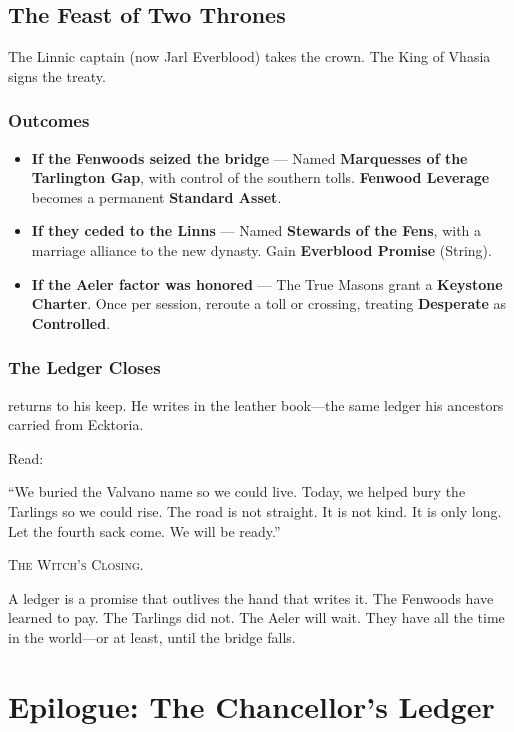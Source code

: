 \documentclass[11pt,a5paper]{book}
\newenvironment{witchclosing}
  {\begin{quoting}[font={small\itshape}, leftmargin=2em, rightmargin=2em]\noindent\textsc{The Witch's Closing.}\par}
  {\end{quoting}}
\begin{document}
\section*{The Feast of Two Thrones}

The Linnic captain (now Jarl Everblood) takes the crown. The King of Vhasia signs the treaty.

\subsection*{Outcomes}
\begin{itemize}[leftmargin=*]
\item \textbf{If the Fenwoods seized the bridge} --- Named \textbf{Marquesses of the Tarlington Gap}, with control of the southern tolls. \textbf{Fenwood Leverage} becomes a permanent \textbf{Standard Asset}.
\item \textbf{If they ceded to the Linns} --- Named \textbf{Stewards of the Fens}, with a marriage alliance to the new dynasty. Gain \textbf{Everblood Promise} (String).
\item \textbf{If the Aeler factor was honored} --- The True Masons grant a \textbf{Keystone Charter}. Once per session, reroute a toll or crossing, treating \textbf{Desperate} as \textbf{Controlled}.
\end{itemize}

\subsection*{The Ledger Closes}

\aldric{} returns to his keep. He writes in the leather book---the same ledger his ancestors carried from Ecktoria.

Read:
\begin{quoting}
``We buried the Valvano name so we could live. Today, we helped bury the Tarlings so we could rise. The road is not straight. It is not kind. It is only long. Let the fourth sack come. We will be ready.''
\end{quoting}

\begin{witchclosing}
A ledger is a promise that outlives the hand that writes it. The Fenwoods have learned to pay. The Tarlings did not. The Aeler will wait. They have all the time in the world---or at least, until the bridge falls.
\end{witchclosing}

\clearpage

\chapter*{Epilogue: The Chancellor's Ledger}
\end{document}
